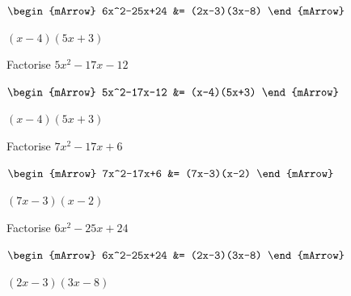 \begin{mtask}
\begin{exercise}
\begin{envSolution}
			      $\begin{mArrow}
			        6x^2-25x+24  &= (2x-3)(3x-8)                       
				 \end{mArrow}$
                 \begin{shortsolution}  
				       $(x-4)(5x+3) $
			     \end{shortsolution}				 
               \end{envSolution}
         \end{exercise}
		 		 
		 		 
   \task \begin{exercise} Factorise $5x^2-17x-12$\\
             \begin{envSolution}
			      
			      $\begin{mArrow}
			        5x^2-17x-12  &= (x-4)(5x+3)                       
				 \end{mArrow}$
                 \begin{shortsolution}  
				       $(x-4)(5x+3) $
			     \end{shortsolution}				 
               \end{envSolution}
         \end{exercise}
		 		 
   \task \begin{exercise} Factorise $7x^2-17x+6$\\
             \begin{envSolution}
			      
			      $\begin{mArrow}
			        7x^2-17x+6  &= (7x-3)(x-2)                       
				 \end{mArrow}$
                 \begin{shortsolution}  
				       $(7x-3)(x-2) $
			     \end{shortsolution}				 
               \end{envSolution}
         \end{exercise}
		 		 
   \task \begin{exercise} Factorise $6x^2-25x+24$\\
             \begin{envSolution}
			      
			      $\begin{mArrow}
			        6x^2-25x+24  &= (2x-3)(3x-8)                       
				 \end{mArrow}$
                 \begin{shortsolution}  
				       $(2x-3)(3x-8) $
			     \end{shortsolution}				 
               \end{envSolution}
         \end{exercise}
		 		 

\end{mtask}
